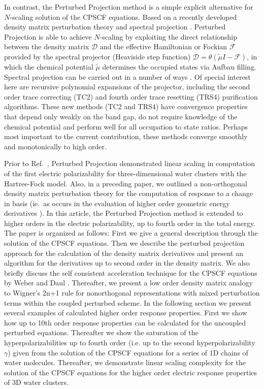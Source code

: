 \documentclass[prl,aps,letterpaper,twocolumn,showpacs,twocolumngrid,superbib]{revtex4}
\begin{document}
In contrast, the Perturbed Projection method is a simple explicit alternative for
$N$-scaling solution of the CPSCF equations.  Based on a recently developed density 
matrix perturbation theory 
\cite{ANiklasson04} and spectral projection \cite{ANiklasson02A,ANiklasson03}.   
Perturbed Projection is able to achieve $N$-scaling by exploiting the direct relationship between 
the density matrix $\mathcal{D}$ and the effective Hamiltonian or Fockian $\mathcal{F}$ provided by
the spectral projector (Heaviside step function) $\mathcal{D}=\theta(\tilde{\mu}I-\mathcal{F})$, 
in which the chemical potential $\tilde{\mu}$ determines the occupied states via Aufbau filling.   
Spectral projection can be carried out in a number of ways 
\cite{ANiklasson02A,ANiklasson03,RMcWeeny60,WClinton69,APalser98,GBeylkin99,KNemeth00,AHolas01}.
Of special interest here are recursive polynomial expansions of the projector, including the second 
order trace correcting (TC2) \cite{ANiklasson02A} and fourth order trace resetting (TRS4) 
\cite{ANiklasson03} purification algorithms.  These new methods (TC2 and TRS4) have convergence 
properties that depend only weakly on the band gap, do not require knowledge of the chemical potential 
and perform well for all occupation to state ratios. Perhaps most important to the current contribution, 
these methods converge smoothly and monotonically to high order.      

Prior to Ref.~, Perturbed Projection demonstrated linear scaling in 
computation of the first electric polarizability for three-dimensional water clusters with the 
Hartree-Fock model. Also, in a preceding paper, we outlined a non-orthogonal density matrix
perturbation theory \cite{ANiklasson05a} for the computation of response to a change in basis (ie.~as occurs in 
the evaluation of higher order geometric energy derivatives \cite{RAmos89}). 
 In this article, the Perturbed Projection method is extended to higher orders
 in the electric polarizability, up to fourth order in the total energy.  The
 paper is organized as follows: 
 First we give a general description through the solution of the CPSCF equations.
 Then we describe the perturbed projection approach for the calculation
 of the density matrix derivatives and present
 an algorithm for the derivatives up to second order in the density matrix.
 We also briefly discuss the self consistent acceleration technique for the 
 CPSCF equations by Weber and Daul \cite{VWeber03}.
 Thereafter, we present a low order density matrix analogy to Wigner's 2n+1 rule 
 for nonorthogonal representations with mixed perturbation terms within the
 coupled perturbed scheme.  In the following section we present several examples
 of calculated higher order response properties. First we show how up to 10th
 order response properties can be calculated for the uncoupled perturbed equations.
 Thereafter we show the saturation of the hyperpolarizabilities up to 
 fourth order (i.e. up to the second hyperpolarizability $\gamma$) given from
 the solution of the CPSCF equations for a series of 1D chains of water molecules. 
 Thereafter, we demonstrate linear scaling complexity for the solution of the CPSCF
 equations for the higher order electric response properties of 3D water clusters.
\end{document}
